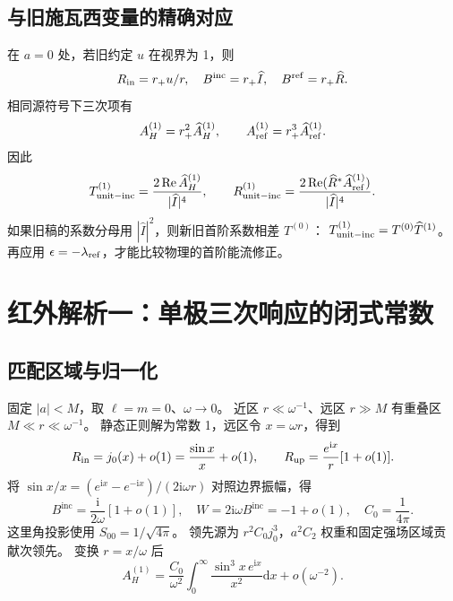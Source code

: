 \documentclass[UTF8,fontset=fandol,11pt,a4paper]{ctexart}
\newcommand{\ii}{\mathrm{i}}
\newcommand{\dd}{\mathrm{d}}
\newcommand{\Rea}{\operatorname{Re}}
\newcommand{\Bin}{B^{\mathrm{inc}}}
\newcommand{\Bref}{B^{\mathrm{ref}}}
\newcommand{\AH}{A_H^{(1)}}
\newcommand{\Aref}{A_{\mathrm{ref}}^{(1)}}
\numberwithin{equation}{section}
\begin{document}
\subsection{与旧施瓦西变量的精确对应}
在 $a=0$ 处，若旧约定 $u$ 在视界为 1，则
\begin{equation}
R_{\rm in}=r_+u/r,\quad\Bin=r_+\widehat I,\quad\Bref=r_+\widehat R.
\end{equation}
相同源符号下三次项有
\begin{equation}
\AH=r_+^2\widehat A_H^{(1)},\qquad\Aref=r_+^3\widehat A_{\rm ref}^{(1)}.
\end{equation}
因此
\begin{equation}
T_{\rm unit-inc}^{(1)}=\frac{2\Rea\widehat A_H^{(1)}}{|\widehat I|^4},\qquad
R_{\rm unit-inc}^{(1)}=\frac{2\Rea(\widehat R^*\widehat A_{\rm ref}^{(1)})}{|\widehat I|^4}.
\end{equation}
如果旧稿的系数分母用 $|\widehat I|^2$，则新旧首阶系数相差 $T^{(0)}$：
$T_{\rm unit-inc}^{(1)}=T^{(0)}\widehat T^{(1)}$。
再应用 $\epsilon=-\lambda_{\rm ref}$，才能比较物理的首阶能流修正。

\section{红外解析一：单极三次响应的闭式常数}
\subsection{匹配区域与归一化}
固定 $|a|<M$，取 $\ell=m=0$、$\omega\to0$。
近区 $r\ll\omega^{-1}$、远区 $r\gg M$ 有重叠区 $M\ll r\ll\omega^{-1}$。
静态正则解为常数 1，远区令 $x=\omega r$，得到
\begin{equation}
R_{
\rm in}=j_0(x)+o(1)=\frac{\sin x}x+o(1),\qquad
R_{\rm up}=\frac{e^{\ii x}}r[1+o(1)].
\end{equation}
将 $\sin x/x=(e^{\ii x}-e^{-\ii x})/(2\ii\omega r)$ 对照边界振幅，得
\begin{equation}
\Bin=\frac{\ii}{2\omega}[1+o(1)],\quad
W=2\ii\omega\Bin=-1+o(1),\quad C_0=\frac1{4\pi}.
\end{equation}
这里角投影使用 $S_{00}=1/\sqrt{4\pi}$。
领先源为 $r^2C_0j_0^3$，$a^2C_2$ 权重和固定强场区域贡献次领先。
变换 $r=x/\omega$ 后
\begin{equation}
\AH=\frac{C_0}{\omega^2}\int_0^\infty
\frac{\sin^3x\,e^{\ii x}}{x^2}\dd x+o(\omega^{-2}).
\end{equation}
\end{document}
